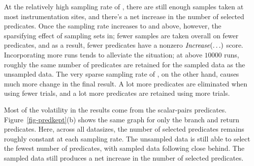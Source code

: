 At the relatively high sampling rate of
, there are still enough samples taken at most
instrumentation sites, and there's a net increase in the number of
selected predicates.  Once the sampling rate increases to
 and above, however, the sparsifying effect of
sampling sets in; fewer samples are taken overall on fewer predicates,
and as a result, fewer predicates have a nonzero $\mbox{\textit{Increase}}(\ldots)$ score.
Incorporating more runs tends to alleviate the situation; at above
$10000$ runs, roughly the same number of predicates are retained for
the  sampled data as the unsampled data.  The very
sparse sampling rate of , on the other hand,
causes much more change in the final result.  A lot more predicates
are eliminated when using fewer trials, and a lot more predicates are
retained using more trials.

Most of the volatility in the results come from the scalar-pairs
predicates.  Figure~\ref{fig-predkept}(b) shows the same graph for
only the branch and return predicates.  Here, across all datasizes,
the number of selected predicates remains roughly constant at each
sampling rate.  The unsampled data is still able to select the fewest
number of predicates, with  sampled data following
close behind.  The  sampled data still produces a
net increase in the number of selected predicates.

